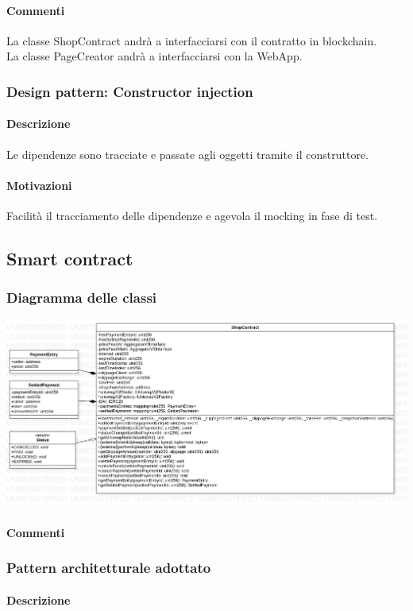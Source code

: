 \documentclass[a4paper, 12pt]{article}
\begin{document}
\paragraph{Commenti}
La classe ShopContract andrà a interfacciarsi con il contratto in blockchain.\\
La classe PageCreator andrà a interfacciarsi con la WebApp.
\subsubsection{Design pattern: Constructor injection}
\paragraph{Descrizione}
Le dipendenze sono tracciate e passate agli oggetti tramite il construttore.
\paragraph{Motivazioni}
Facilità il tracciamento delle dipendenze e agevola il mocking in fase di test.

\subsection{Smart contract}
\subsubsection{Diagramma delle classi}
\includegraphics[width=1.0\textwidth]{contract}
\paragraph{Commenti}
\subsubsection{Pattern architetturale adottato}
\paragraph{Descrizione}
\end{document}
